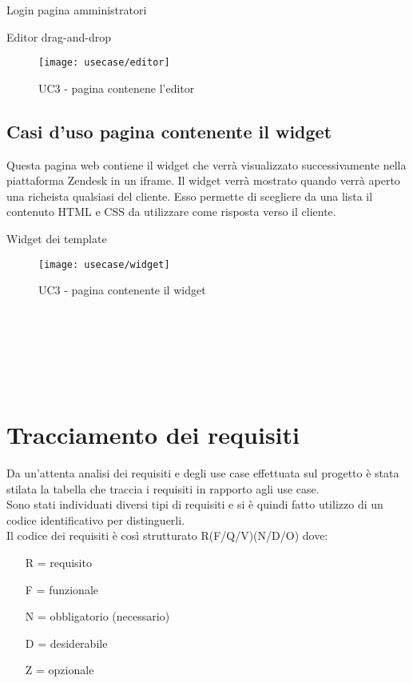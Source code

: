 \begin{usecase}{1}{Login pagina amministratori}
\begin{usecase}{3}{Editor drag-and-drop}
	\begin{figure}[!h] 
		\centering 
		\texttt{[image: usecase/editor]} 
		\caption{UC3 - pagina contenene l'editor}
	\end{figure}
\end{usecase}
\newpage
\subsection{ Casi d'uso pagina contenente il widget}
Questa pagina web contiene il widget che verrà visualizzato successivamente nella piattaforma Zendesk in un iframe. Il widget verrà mostrato quando verrà aperto una richeista qualsiasi del cliente. Esso permette di scegliere da una lista il contenuto HTML e CSS da utilizzare come risposta verso il cliente. 
\begin{usecase}{4}{Widget dei template}
	
	\begin{figure}[!h] 
		\centering 
		\texttt{[image: usecase/widget]} 
		\caption{UC3 - pagina contenente il widget}
	\end{figure}
\\
\\
\\
\\
\\
\end{usecase}

\section{Tracciamento dei requisiti}

Da un'attenta analisi dei requisiti e degli use case effettuata sul progetto è stata stilata la tabella che traccia i requisiti in rapporto agli use case.\\
Sono stati individuati diversi tipi di requisiti e si è quindi fatto utilizzo di un codice identificativo per distinguerli.\\
Il codice dei requisiti è così strutturato R(F/Q/V)(N/D/O) dove:
\begin{enumerate}
	\item[R =] requisito
    \item[F =] funzionale
    \item[N =] obbligatorio (necessario)
    \item[D =] desiderabile
    \item[Z =] opzionale
\end{enumerate}


\end{usecase}
